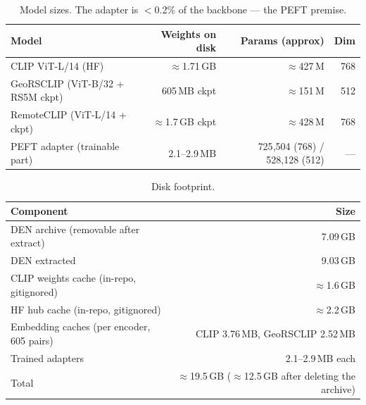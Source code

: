 \documentclass{article}
\begin{document}
\begin{table}[H]
    \centering
    \caption{Model sizes. The adapter is $<$0.2\% of the backbone --- the PEFT premise.}
    \label{tab:models}
    \begin{tabular}{lrrr}
        \toprule
        \textbf{Model} & \textbf{Weights on disk} & \textbf{Params (approx)} & \textbf{Dim} \\
        \midrule
        CLIP ViT-L/14 (HF)                       & $\approx$1.71\,GB & $\approx$427\,M & 768 \\
        GeoRSCLIP (ViT-B/32 + RS5M ckpt)         & 605\,MB ckpt      & $\approx$151\,M & 512 \\
        RemoteCLIP (ViT-L/14 + ckpt)             & $\approx$1.7\,GB ckpt & $\approx$428\,M & 768 \\
        PEFT adapter (trainable part)   & 2.1--2.9\,MB      & 725{,}504 (768) / 528{,}128 (512) & --- \\
        \bottomrule
    \end{tabular}
\end{table}

\begin{table}[H]
    \centering
    \caption{Disk footprint.}
    \label{tab:disk}
    \begin{tabular}{lr}
        \toprule
        \textbf{Component} & \textbf{Size} \\
        \midrule
        DEN archive (removable after extract)        & 7.09\,GB \\
        DEN extracted                                & 9.03\,GB \\
        CLIP weights cache (in-repo, gitignored)     & $\approx$1.6\,GB \\
        HF hub cache (in-repo, gitignored)           & $\approx$2.2\,GB \\
        Embedding caches (per encoder, 605 pairs)    & CLIP 3.76\,MB, GeoRSCLIP 2.52\,MB \\
        Trained adapters                             & 2.1--2.9\,MB each \\
        Total                               & $\approx$19.5\,GB ($\approx$12.5\,GB after deleting the archive) \\
        \bottomrule
    \end{tabular}
\end{table}
\end{document}
